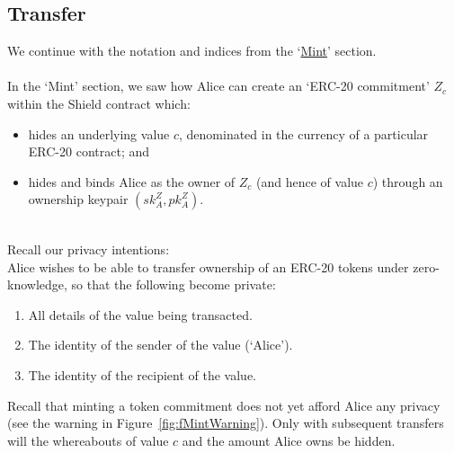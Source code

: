 \subsection{Transfer}
\label{sec:20Transfer}

We continue with the notation and indices from the `\hyperref[sec:Mint]{Mint}' section.\\
\\
In the `Mint' section, we saw how Alice can create an `ERC-20 commitment' $Z_c$ within the Shield contract which:
\begin{itemize}
  \item hides an underlying value $c$, denominated in the currency of a particular ERC-20 contract; and
  \item hides and binds Alice as the owner of $Z_c$ (and hence of value $c$) through an ownership keypair $(sk_A^Z, pk_A^Z)$.
\end{itemize}
\ \\
Recall our privacy intentions:\\
Alice wishes to be able to transfer ownership of an ERC-20 tokens under zero-knowledge, so that the following become private:
	\begin{center}
		\begin{framed}
      \begin{enumerate}
        \item All details of the value being transacted.
        \item The identity of the sender of the value (`Alice').
        \item The identity of the recipient of the value.
      \end{enumerate}
    \end{framed}
  \end{center}

\noindent
Recall that minting a token commitment does not yet afford Alice any privacy (see the warning in Figure~\ref{fig:fMintWarning}). Only with subsequent transfers will the whereabouts of value $c$ and the amount Alice owns be hidden.\\
\\



